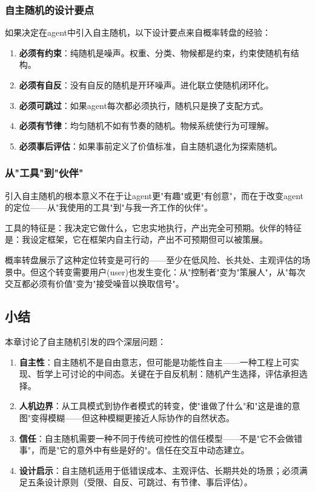 \documentclass[12pt,a4paper]{ctexart}
\begin{document}
\subsubsection{自主随机的设计要点}

如果决定在agent中引入自主随机，以下设计要点来自概率转盘的经验：

\begin{enumerate}[nosep]
\item \textbf{必须有约束}：纯随机是噪声。权重、分类、物候都是约束，约束使随机有结构。
\item \textbf{必须有自反}：没有自反的随机是开环噪声。进化联立使随机闭环化。
\item \textbf{必须可跳过}：如果agent每次都必须执行，随机只是换了支配方式。
\item \textbf{必须有节律}：均匀随机不如有节奏的随机。物候系统使行为可理解。
\item \textbf{必须事后评估}：如果事前定义了价值标准，自主随机退化为探索随机。
\end{enumerate}

\subsubsection{从"工具"到"伙伴"}

引入自主随机的根本意义不在于让agent更"有趣"或更"有创意"，而在于改变agent的定位——从"我使用的工具"到"与我一齐工作的伙伴"。

工具的特征是：我决定它做什么，它忠实地执行，产出完全可预期。伙伴的特征是：我设定框架，它在框架内自主行动，产出不可预期但可以被策展。

概率转盘展示了这种定位转变是可行的——至少在低风险、长共处、主观评估的场景中。但这个转变需要用户(user)也发生变化：从"控制者"变为"策展人"，从"每次交互都必须有价值"变为"接受噪音以换取信号"。

\subsection{小结}

本章讨论了自主随机引发的四个深层问题：

\begin{enumerate}[nosep]
\item \textbf{自主性}：自主随机不是自由意志，但可能是功能性自主——一种工程上可实现、哲学上可讨论的中间态。关键在于自反机制：随机产生选择，评估承担选择。
\item \textbf{人机边界}：从工具模式到协作者模式的转变，使"谁做了什么"和"这是谁的意图"变得模糊——但这种模糊更接近人际协作的自然状态。
\item \textbf{信任}：自主随机需要一种不同于传统可控性的信任模型——不是"它不会做错事"，而是"它的意外中有些是好的"。信任在交互中动态建立。
\item \textbf{设计启示}：自主随机适用于低错误成本、主观评估、长期共处的场景；必须满足五条设计原则（受限、自反、可跳过、有节律、事后评估）。
\end{enumerate}
\end{document}

